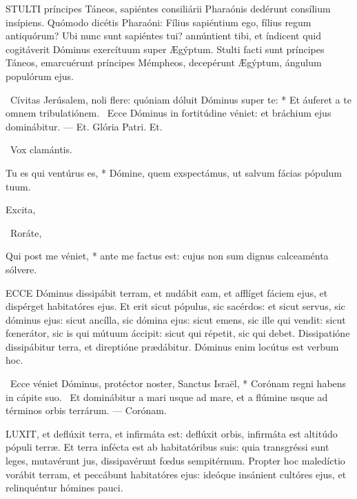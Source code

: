 
\lettrine[lines=2]{S}{TULTI} príncipes Táneos, sapiéntes consiliárii Pharaónis dedérunt consílium insípiens. Quómodo dicétis Pharaóni: Fílius sapiéntium ego, fílius regum antiquórum? Ubi nunc sunt sapiéntes tui? annúntient tibi, et índicent quid cogitáverit Dóminus exercítuum super Ægýptum. Stulti facti sunt príncipes Táneos, emarcuérunt príncipes Mémpheos, decepérunt Ægýptum, ángulum populórum ejus.

\R\ Cívitas Jerúsalem, noli flere: quóniam dóluit Dóminus super te: * Et áuferet a te omnem tribulatiónem. \V\ Ecce Dóminus in fortitúdine véniet: et bráchium ejus dominábitur. --- Et. Glória Patri. Et.

\V\ Vox clamántis.

 Tu es qui ventúrus es, * Dómine, quem exspectámus, ut salvum fácias pópulum tuum.

 Excita, 

\V\ Roráte, 

 Qui post me véniet, * ante me factus est: cujus non sum dignus calceaménta sólvere.




\lettrine[lines=2]{E}{CCE} Dóminus dissipábit terram, et nudábit eam, et afflíget fáciem ejus, et dispérget habitatóres ejus. Et erit sicut pópulus, sic sacérdos: et sicut servus, sic dóminus ejus: sicut ancílla, sic dómina ejus: sicut emens, sic ille qui vendit: sicut fœnerátor, sic is qui mútuum áccipit: sicut qui répetit, sic qui debet. Dissipatióne dissipábitur terra, et direptióne prædábitur. Dóminus enim locútus est verbum hoc.

\R\ Ecce véniet Dóminus, protéctor noster, Sanctus Israël, * Corónam regni habens in cápite suo. \V\ Et dominábitur a mari usque ad mare, et a flúmine usque ad términos orbis terrárum. --- Corónam.


\lettrine[lines=2]{L}{UXIT}, et deflúxit terra, et infirmáta est: deflúxit orbis, infirmáta est altitúdo pópuli terræ. Et terra infécta est ab habitatóribus suis: quia transgréssi sunt leges, mutavérunt jus, dissipavérunt fœdus sempitérnum. Propter hoc maledíctio vorábit terram, et peccábunt habitatóres ejus: ideóque insánient cultóres ejus, et relinquéntur hómines pauci.

